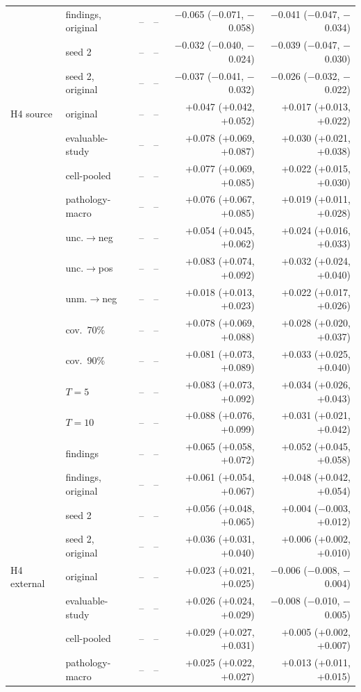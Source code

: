 \begin{longtable}{llrrrr}
 & findings, original & -- & -- & $-$0.065 ($-$0.071, $-$0.058) & $-$0.041 ($-$0.047, $-$0.034)\\
 & seed 2 & -- & -- & $-$0.032 ($-$0.040, $-$0.024) & $-$0.039 ($-$0.047, $-$0.030)\\
 & seed 2, original & -- & -- & $-$0.037 ($-$0.041, $-$0.032) & $-$0.026 ($-$0.032, $-$0.022)\\
\midrule
H4 source & original & -- & -- & +0.047 (+0.042, +0.052) & +0.017 (+0.013, +0.022)\\
 & evaluable-study & -- & -- & +0.078 (+0.069, +0.087) & +0.030 (+0.021, +0.038)\\
 & cell-pooled & -- & -- & +0.077 (+0.069, +0.085) & +0.022 (+0.015, +0.030)\\
 & pathology-macro & -- & -- & +0.076 (+0.067, +0.085) & +0.019 (+0.011, +0.028)\\
 & unc.$\to$neg & -- & -- & +0.054 (+0.045, +0.062) & +0.024 (+0.016, +0.033)\\
 & unc.$\to$pos & -- & -- & +0.083 (+0.074, +0.092) & +0.032 (+0.024, +0.040)\\
 & unm.$\to$neg & -- & -- & +0.018 (+0.013, +0.023) & +0.022 (+0.017, +0.026)\\
 & cov.\ 70\% & -- & -- & +0.078 (+0.069, +0.088) & +0.028 (+0.020, +0.037)\\
 & cov.\ 90\% & -- & -- & +0.081 (+0.073, +0.089) & +0.033 (+0.025, +0.040)\\
 & $T=5$ & -- & -- & +0.083 (+0.073, +0.092) & +0.034 (+0.026, +0.043)\\
 & $T=10$ & -- & -- & +0.088 (+0.076, +0.099) & +0.031 (+0.021, +0.042)\\
 & findings & -- & -- & +0.065 (+0.058, +0.072) & +0.052 (+0.045, +0.058)\\
 & findings, original & -- & -- & +0.061 (+0.054, +0.067) & +0.048 (+0.042, +0.054)\\
 & seed 2 & -- & -- & +0.056 (+0.048, +0.065) & +0.004 ($-$0.003, +0.012)\\
 & seed 2, original & -- & -- & +0.036 (+0.031, +0.040) & +0.006 (+0.002, +0.010)\\
\midrule
H4 external & original & -- & -- & +0.023 (+0.021, +0.025) & $-$0.006 ($-$0.008, $-$0.004)\\
 & evaluable-study & -- & -- & +0.026 (+0.024, +0.029) & $-$0.008 ($-$0.010, $-$0.005)\\
 & cell-pooled & -- & -- & +0.029 (+0.027, +0.031) & +0.005 (+0.002, +0.007)\\
 & pathology-macro & -- & -- & +0.025 (+0.022, +0.027) & +0.013 (+0.011, +0.015)\\

\end{longtable}
